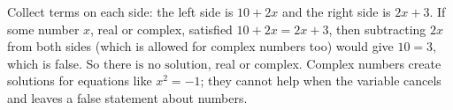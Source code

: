 Collect terms on each side: the left side is $10+2x$ and the right side is $2x+3$. If some number $x$, real or complex, satisfied $10+2x=2x+3$, then subtracting $2x$ from both sides (which is allowed for complex numbers too) would give $10=3$, which is false. So $\boxed{\text{there is no solution}}$, real or complex. Complex numbers create solutions for equations like $x^2=-1$; they cannot help when the variable cancels and leaves a false statement about numbers.
